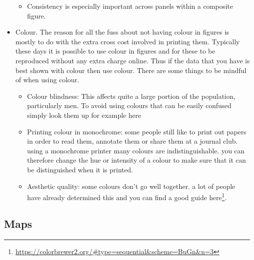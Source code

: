 \documentclass[
]{krantz}
\providecommand{\tightlist}{%
  \setlength{\itemsep}{0pt}\setlength{\parskip}{0pt}}
\renewcommand{\href}[2]{#2\footnote{\url{#1}}}
\begin{document}
\begin{itemize}
  \begin{itemize}
  \tightlist
  \item
    Consistency is especially important across panels within a composite figure.
  \end{itemize}
\item
  Colour. The reason for all the fuss about not having colour in figures is mostly to do with the extra cross cost involved in printing them. Typically these days it is possible to use colour in figures and for these to be reproduced without any extra charge online. Thus if the data that you have is best shown with colour then use colour. There are some things to be mindful of when using colour.

  \begin{itemize}
  \tightlist
  \item
    Colour blindness: This affects quite a large portion of the population, particularly men. To avoid using colours that can be easily confused simply look them up for example here
  \item
    Printing colour in monochrome: some people still like to print out papers in order to read them, annotate them or share them at a journal club. using a monochrome printer many colours are indistinguishable. you can therefore change the hue or intensity of a colour to make sure that it can be distinguished when it is printed.
  \item
    Aesthetic quality: some colours don't go well together. a lot of people have already determined this and you can find a good guide \href{https://colorbrewer2.org/\#type=sequential\&scheme=BuGn\&n=3}{here}.
  \end{itemize}
\end{itemize}

\hypertarget{maps}{%
\subsection{Maps}\label{maps}}
\end{document}
